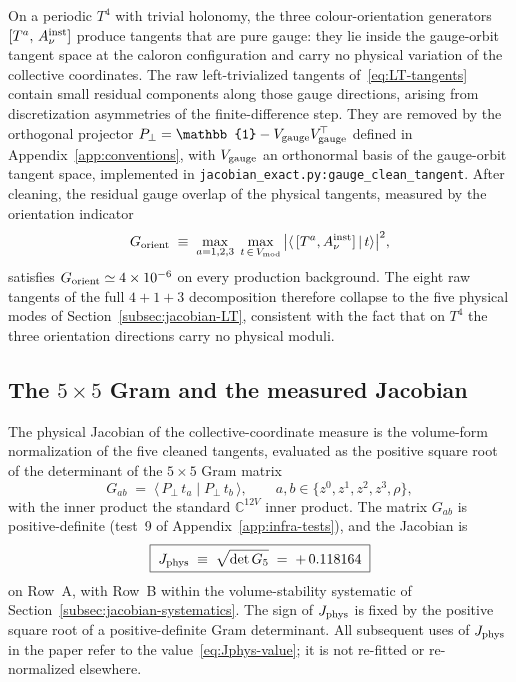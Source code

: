 \documentclass[a4paper,11pt]{article}
\theoremstyle{definition}
\newcommand{\Jphys}{J_{\rm phys}}
\begin{document}
On a periodic $T^4$ with trivial holonomy, the three colour-orientation
generators $[T^a,\,A_\nu^{\rm inst}]$ produce tangents that are pure
gauge: they lie inside the gauge-orbit tangent space at the caloron
configuration and carry no physical variation of the collective
coordinates. The raw left-trivialized tangents
of~\eqref{eq:LT-tangents} contain small residual components along
those gauge directions, arising from discretization asymmetries of
the finite-difference step. They are removed by the orthogonal
projector
$P_\perp = \mathbb{1} - V_{\rm gauge}V_{\rm gauge}^{\!\top}$ defined
in Appendix~\ref{app:conventions}, with $V_{\rm gauge}$ an
orthonormal basis of the gauge-orbit tangent space, implemented in
\texttt{jacobian\_exact.py:gauge\_clean\_tangent}. After cleaning, the
residual gauge overlap of the physical tangents, measured by the
orientation indicator
\begin{equation}
G_{\rm orient}
\;\equiv\;
\max_{a=1,2,3}\;\max_{t\,\in\,V_{\rm mod}}\,
\bigl|\langle\,[T^a,A_\nu^{\rm inst}]\,|\,t\rangle\bigr|^2,
\label{eq:Gorient}
\end{equation}
satisfies $G_{\rm orient} \simeq 4\times 10^{-6}$ on every production
background. The eight raw tangents of the full $4 + 1 + 3$
decomposition therefore collapse to the five physical modes of
Section~\ref{subsec:jacobian-LT}, consistent with the fact that on
$T^4$ the three orientation directions carry no physical moduli.

\subsection{The $5\times 5$ Gram and the measured Jacobian}
\label{subsec:jacobian-Gram}

The physical Jacobian of the collective-coordinate measure is the
volume-form normalization of the five cleaned tangents, evaluated as
the positive square root of the determinant of the $5\times 5$ Gram
matrix
\begin{equation}
G_{ab}
\;=\;
\bigl\langle\,P_\perp\,t_a\;|\;P_\perp\,t_b\,\bigr\rangle,
\qquad
a,b \in \bigl\{z^0,z^1,z^2,z^3,\rho\bigr\},
\label{eq:Gram-5x5}
\end{equation}
with the inner product the standard $\mathbb{C}^{12V}$ inner product.
The matrix $G_{ab}$ is positive-definite (test~9 of
Appendix~\ref{app:infra-tests}), and the Jacobian is
\begin{equation}
\boxed{\;\Jphys \;\equiv\; \sqrt{\det G_5} \;=\; +\,0.118164\;}
\label{eq:Jphys-value}
\end{equation}
on Row~A, with Row~B within the volume-stability systematic of
Section~\ref{subsec:jacobian-systematics}. The sign of $\Jphys$ is
fixed by the positive square root of a positive-definite Gram
determinant. All subsequent uses of $\Jphys$ in the paper refer to
the value~\eqref{eq:Jphys-value}; it is not re-fitted or re-normalized
elsewhere.
\end{document}
